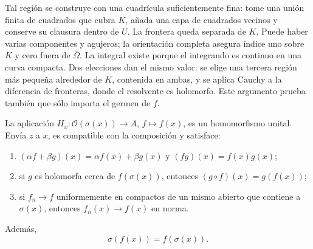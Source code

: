 Tal región se construye con una cuadrícula suficientemente fina: tome una unión finita de cuadrados que cubra $K$, añada una capa de cuadrados vecinos y conserve su clausura dentro de $U$. La frontera queda separada de $K$. Puede haber varias componentes y agujeros; la orientación completa asegura índice uno sobre $K$ y cero fuera de $\overline\Omega$. La integral existe porque el integrando es continuo en una curva compacta. Dos elecciones dan el mismo valor: se elige una tercera región más pequeña alrededor de $K$, contenida en ambas, y se aplica Cauchy a la diferencia de fronteras, donde el resolvente es holomorfo. Este argumento prueba también que sólo importa el germen de $f$.

\begin{teorema}\label{v3:calculo-holomorfo}
La aplicación $H_x:\mathcal O(\sigma(x))\to A$, $f\mapsto f(x)$, es un homomorfismo unital. Envía $z$ a $x$, es compatible con la composición y satisface:
\begin{enumerate}[label=(\roman*)]
\item $(\alpha f+\beta g)(x)=\alpha f(x)+\beta g(x)$ y $(fg)(x)=f(x)g(x)$;
\item si $g$ es holomorfa cerca de $f(\sigma(x))$, entonces $(g\circ f)(x)=g(f(x))$;
\item si $f_n\to f$ uniformemente en compactos de un mismo abierto que contiene a $\sigma(x)$, entonces $f_n(x)\to f(x)$ en norma.
\end{enumerate}
Además,
\[
 \sigma(f(x))=f(\sigma(x)).
\]
\end{teorema}
